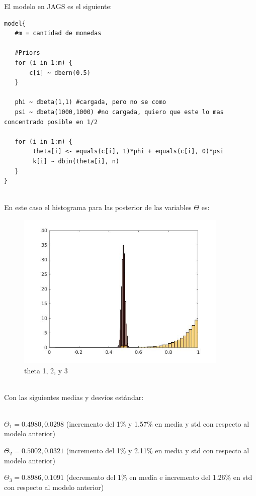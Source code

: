 El modelo en JAGS es el siguiente:

\begin{verbatim}
model{
   #m = cantidad de monedas

   #Priors
   for (i in 1:m) {
   	   c[i] ~ dbern(0.5)
   }
   
   phi ~ dbeta(1,1) #cargada, pero no se como
   psi ~ dbeta(1000,1000) #no cargada, quiero que este lo mas concentrado posible en 1/2

   for (i in 1:m) {
   		theta[i] <- equals(c[i], 1)*phi + equals(c[i], 0)*psi
   		k[i] ~ dbin(theta[i], n)
   }
}
\end{verbatim}

~\\
\newpage
En este caso el histograma para las posterior de las variables $\Theta$ es:

\begin{figure}[h]
    \includegraphics[width=0.9\textwidth]{imagenes/conjunta-modelo2.jpg}
  \caption{theta 1, 2, y 3}
\end{figure}
~\\

Con las siguientes medias y desvíos estándar:

~\\

$\Theta_{1} = 0.4980, 0.0298$ (incremento del 1\% y 1.57\% en media y std con respecto al modelo anterior)

$\Theta_{2} = 0.5002, 0.0321$ (incremento del 1\% y 2.11\% en media y std con respecto al modelo anterior)

$\Theta_{3} = 0.8986, 0.1091$ (decremento del 1\% en media e incremento del 1.26\% en std con respecto al modelo anterior)


